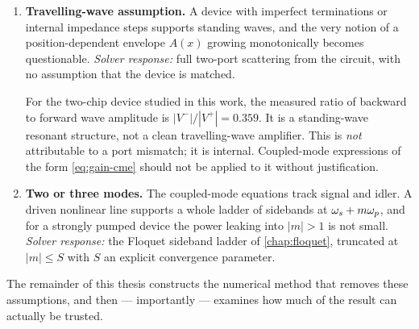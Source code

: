 \begin{enumerate}
\item \textbf{Travelling-wave assumption.} A device with imperfect terminations
      or internal impedance steps supports standing waves, and the very notion
      of a position-dependent envelope $A(x)$ growing monotonically becomes
      questionable.
      \emph{Solver response:} full two-port scattering from the circuit, with
      no assumption that the device is matched.
      \begin{caveat}
      For the two-chip device studied in this work, the measured ratio of
      backward to forward wave amplitude is $|V^-|/|V^+| = 0.359$. It is a
      standing-wave resonant structure, not a clean travelling-wave amplifier.
      This is \emph{not} attributable to a port mismatch; it is internal.
      Coupled-mode expressions of the form \eqref{eq:gain-cme} should not be
      applied to it without justification.
      \end{caveat}

\item \textbf{Two or three modes.} The coupled-mode equations track signal and
      idler. A driven nonlinear line supports a whole ladder of sidebands at
      $\omega_{s} + m\omega_{p}$, and for a strongly pumped device the power leaking into
      $|m|>1$ is not small.
      \emph{Solver response:} the Floquet sideband ladder of
      \cref{chap:floquet}, truncated at $|m|\le S$ with $S$ an explicit
      convergence parameter.
\end{enumerate}

The remainder of this thesis constructs the numerical method that removes these
assumptions, and then --- importantly --- examines how much of the result can
actually be trusted.
